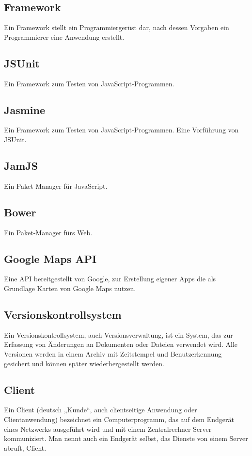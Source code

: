 \documentclass[11pt,a4paper]{article}
\begin{document}
\subsection{Framework}
Ein Framework stellt ein Programmiergerüst dar, nach dessen Vorgaben ein Programmierer eine Anwendung erstellt.

\subsection{JSUnit} Ein Framework zum Testen von JavaScript-Programmen.

\subsection{Jasmine} Ein Framework zum Testen von JavaScript-Programmen. Eine Vorführung von JSUnit.

\subsection{JamJS}
Ein Paket-Manager für JavaScript.

\subsection{Bower}
Ein Paket-Manager fürs Web.


\subsection{Google Maps API}
Eine API bereitgestellt von Google, zur Erstellung eigener Apps die als Grundlage Karten von Google Maps nutzen.


\subsection{Versionskontrollsystem}
Ein Versionskontrollsystem, auch Versionsverwaltung, ist ein System, das zur Erfassung von Änderungen an Dokumenten oder Dateien verwendet wird. Alle Versionen werden in einem Archiv mit Zeitstempel und Benutzerkennung gesichert und können später wiederhergestellt werden.

\subsection{Client}
Ein Client (deutsch „Kunde“, auch clientseitige Anwendung oder Clientanwendung) bezeichnet ein Computerprogramm, das auf dem Endgerät eines Netzwerks ausgeführt wird und mit einem Zentralrechner Server kommuniziert. Man nennt auch ein Endgerät selbst, das Dienste von einem Server abruft, Client.
\end{document}
